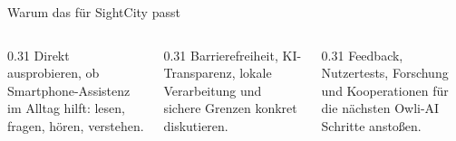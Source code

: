 \begin{PosterBlock}{Warum das für SightCity passt}
\begin{columns}[t,totalwidth=\linewidth]
  \begin{column}{0.31\linewidth}
    \vspace{2mm}
    {\large Direkt ausprobieren, ob Smartphone-Assistenz im Alltag hilft: lesen, fragen, hören, verstehen.}
  \end{column}
  \begin{column}{0.31\linewidth}
    \vspace{2mm}
    {\large Barrierefreiheit, KI-Transparenz, lokale Verarbeitung und sichere Grenzen konkret diskutieren.}
  \end{column}
  \begin{column}{0.31\linewidth}
    \vspace{2mm}
    {\large Feedback, Nutzertests, Forschung und Kooperationen für die nächsten Owli-AI Schritte anstoßen.}
  \end{column}
\end{columns}

\vspace{7mm}
\centering
{}\hspace{2mm}\hspace{2mm}\hspace{2mm}
\end{PosterBlock}
